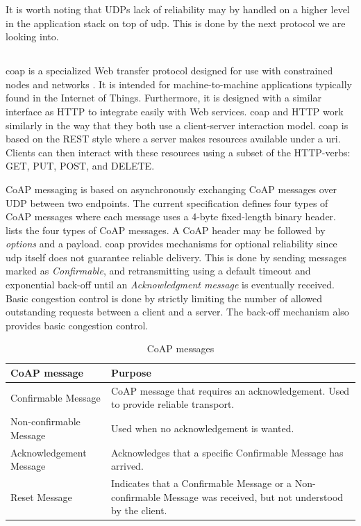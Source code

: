  It is worth noting that UDPs lack of reliability may by handled on a higher
 level in the application stack on top of \gls{udp}. This is done by the next
 protocol we are looking into.

\subsection{}

\gls{coap} is a specialized Web transfer protocol designed for use with
constrained nodes and  networks \cite{rfc-7252}. It is intended for
machine-to-machine applications typically found in the Internet of Things.
Furthermore, it is designed with a similar interface as HTTP to integrate easily
with Web services. \gls{coap} and HTTP work similarly in the way that they both
use a client-server interaction model. \Gls{coap} is based on the REST style
where a server makes resources available under a \gls{uri}. Clients can then
interact with these resources using a subset of the HTTP-verbs: GET, PUT, POST,
and DELETE.

CoAP messaging is based on asynchronously exchanging CoAP messages over UDP
between two endpoints. The current specification defines four types of CoAP
messages where each message uses a 4-byte fixed-length binary header.
 lists the four types of CoAP messages. A CoAP header
may be followed by \textit{options} and a payload. \Gls{coap} provides
mechanisms for optional reliability since \gls{udp} itself does not guarantee
reliable delivery. This is done by sending messages marked as
\textit{Confirmable}, and retransmitting using a default timeout and exponential
back-off until an \textit{Acknowledgment message} is eventually received. Basic
congestion control is done by strictly limiting the number of allowed
outstanding requests between a client and a server. The back-off mechanism also
provides basic congestion control.

\begin{table}[h]
\centering
\begin{tabularx}{\textwidth}{|X|X|}
\hline
\textbf{CoAP message}   & \textbf{Purpose}                                                                                                  \\ \hline
Confirmable Message     & CoAP message that  requires an acknowledgement. Used to provide reliable transport.                               \\ \hline
Non-confirmable Message & Used when no acknowledgement is wanted.                                                                           \\ \hline
Acknowledgement Message & Acknowledges that a specific Confirmable Message has arrived.                                                     \\ \hline
Reset Message           & Indicates that a Confirmable Message or a Non-confirmable Message was received, but not understood by the client. \\ \hline
\end{tabularx}

\caption{CoAP messages}
\label{table:coap-messages}
\end{table}

